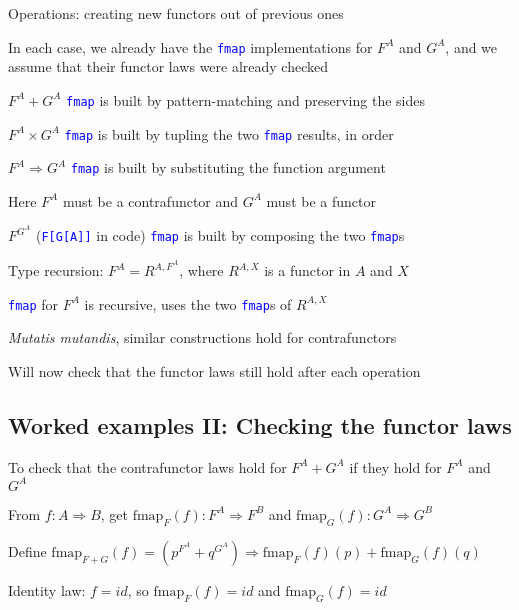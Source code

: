 Operations: creating new functors out of previous ones

In each case, we already have the \texttt{\textcolor{blue}{\footnotesize{}fmap}}
implementations for $F^{A}$ and $G^{A}$, and we assume that their
functor laws were already checked 

$F^{A}+G^{A}$ \textendash{} \texttt{\textcolor{blue}{\footnotesize{}fmap}}
is built by pattern-matching and preserving the sides

$F^{A}\times G^{A}$ \textendash{} \texttt{\textcolor{blue}{\footnotesize{}fmap}}
is built by tupling the two \texttt{\textcolor{blue}{\footnotesize{}fmap}}
results, in order

$F^{A}\Rightarrow G^{A}$ \textendash{} \texttt{\textcolor{blue}{\footnotesize{}fmap}}
is built by substituting the function argument

Here $F^{A}$ must be a contrafunctor and $G^{A}$ must be a functor

$F^{G^{A}}$ (\texttt{\textcolor{blue}{\footnotesize{}F{[}G{[}A{]}{]}}}
in code) \textendash{} \texttt{\textcolor{blue}{\footnotesize{}fmap}}
is built by composing the two \texttt{\textcolor{blue}{\footnotesize{}fmap}}s

Type recursion: $F^{A}=R^{A,F^{A}}$, where $R^{A,X}$ is a functor
in $A$ and $X$

\texttt{\textcolor{blue}{\footnotesize{}fmap}} for $F^{A}$ is recursive,
uses the two \texttt{\textcolor{blue}{\footnotesize{}fmap}}s of $R^{A,X}$

\emph{Mutatis mutandis}, similar constructions hold for contrafunctors\emph{ }

Will now check that the functor laws still hold after each operation

\subsection{Worked examples II: Checking the functor laws}

To check that the contrafunctor laws hold for $F^{A}+G^{A}$ if they
hold for $F^{A}$ and $G^{A}$

From $f:A\Rightarrow B$, get $\text{fmap}_{F}(f):F^{A}\Rightarrow F^{B}$
and $\text{fmap}_{G}(f):G^{A}\Rightarrow G^{B}$

Define $\text{fmap}_{F+G}(f)=(p^{F^{A}}+q^{G^{A}})\Rightarrow\text{fmap}_{F}(f)(p)+\text{fmap}_{G}(f)(q)$

Identity law: $f=id$, so $\text{fmap}_{F}(f)=id$ and $\text{fmap}_{G}(f)=id$

